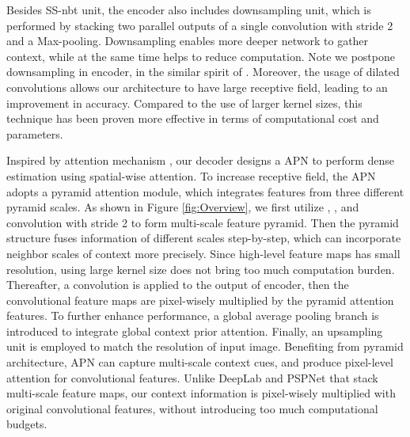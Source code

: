 \documentclass{article}
\begin{document}
Besides SS-nbt unit, the encoder also includes downsampling unit, which is performed by stacking two parallel outputs of a single  convolution with stride 2 and a Max-pooling. Downsampling enables more deeper network to gather context, while at the same time helps to reduce computation. Note we postpone downsampling in encoder, in the similar spirit of \cite{Szegedy2016rethinking}. Moreover, the usage of dilated convolutions \cite{Romera2018erfnet,multi2016yu} allows our architecture to have large receptive field, leading to an improvement in accuracy. Compared to the use of larger kernel sizes, this technique has been proven more effective in terms of computational cost and parameters.

Inspired by attention mechanism \cite{hu2017squeeze}, our decoder designs a APN to perform dense estimation using spatial-wise attention. To increase receptive field, the APN adopts a pyramid attention module, which integrates features from three different pyramid scales. As shown in Figure \ref{fig:Overview}, we first utilize , , and  convolution with stride 2 to form multi-scale feature pyramid. Then the pyramid structure fuses information of different scales step-by-step, which can incorporate neighbor scales of context more precisely. Since high-level feature maps has small resolution, using large kernel size does not bring too much computation burden. Thereafter, a  convolution is applied to the output of encoder, then the convolutional feature maps are pixel-wisely multiplied by the pyramid attention features. To further enhance performance, a global average pooling branch is introduced to integrate global context prior attention. Finally, an upsampling unit is employed to match the resolution of input image. Benefiting from pyramid architecture, APN can capture multi-scale context cues, and produce pixel-level attention for convolutional features. Unlike DeepLab \cite{Chen2016deeplab} and PSPNet \cite{zhao2017pyramid} that stack multi-scale feature maps, our context information is pixel-wisely multiplied with original convolutional features, without introducing too much computational budgets.
\end{document}
